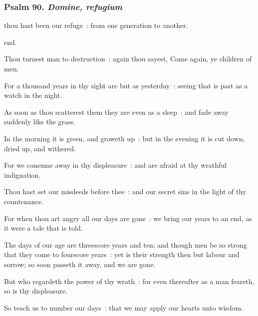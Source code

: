 \subsubsection{Psalm 90. \textit{Domine, refugium}}
 thou hast been our refuge~: from one generation to another.\par
\noindent
end.\par
{}Thou turnest man to destruction~: again thou sayest, Come again, ye children of men.\par
{}For a thousand years in thy sight are but as yesterday~: seeing that is past as a watch in the night.\par
{}As soon as thou scatterest them they are even as a sleep~: and fade away suddenly like the grass.\par
{}In the morning it is green, and groweth up~: but in the evening it is cut down, dried up, and withered.\par
{}For we consume away in thy displeasure~: and are afraid at thy wrathful indignation.\par
{}Thou hast set our misdeeds before thee~: and our secret sins in the light of thy countenance.\par
{}For when thou art angry all our days are gone~: we bring our years to an end, as it were a tale that is told.\par
{}The days of our age are threescore years and ten; and though men be so strong that they come to fourscore years~: yet is their strength then but labour and sorrow; so soon passeth it away, and we are gone.\par
{}But who regardeth the power of thy wrath~: for even thereafter as a man feareth, so is thy displeasure.\par
{}So teach us to number our days~: that we may apply our hearts unto wisdom.\par

